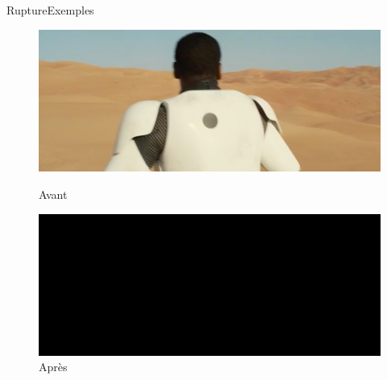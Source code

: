 \begin{frame}{Rupture}{Exemples}

\begin{figure}
   \begin{minipage}[c]{.46\linewidth}
	  \centering
      \includegraphics[scale=0.2]{images/rupture1-1.png}
      \caption{Avant}
   \end{minipage} \hfill
   \begin{minipage}[c]{.46\linewidth}
      \centering
      \includegraphics[scale=0.2]{images/rupture1-2.png}
      \caption{Après}
   \end{minipage}
\end{figure}


\end{frame}
